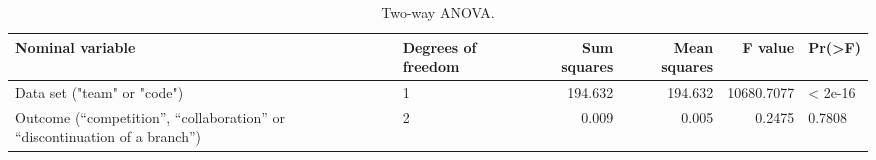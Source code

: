 \begin{table}[H]
\caption{Two-way ANOVA.}
\label{table:ch4_rq2_anova} 
\centering
\begin{tabu} to 
  \toprule
  Nominal variable & Degrees of freedom & Sum squares & Mean squares & F value & Pr(>F) \\
  \midrule
  Data set ("team" or "code") & 1 & 194.632 & 194.632 & 10680.7077 & < 2e-16 \\
  Outcome (“competition”,
  “collaboration”
  or
  “discontinuation of a branch”) & 2 & 0.009 & 0.005 & 0.2475 & 0.7808 \\
  \bottomrule
\end{tabu}
\end{table}
